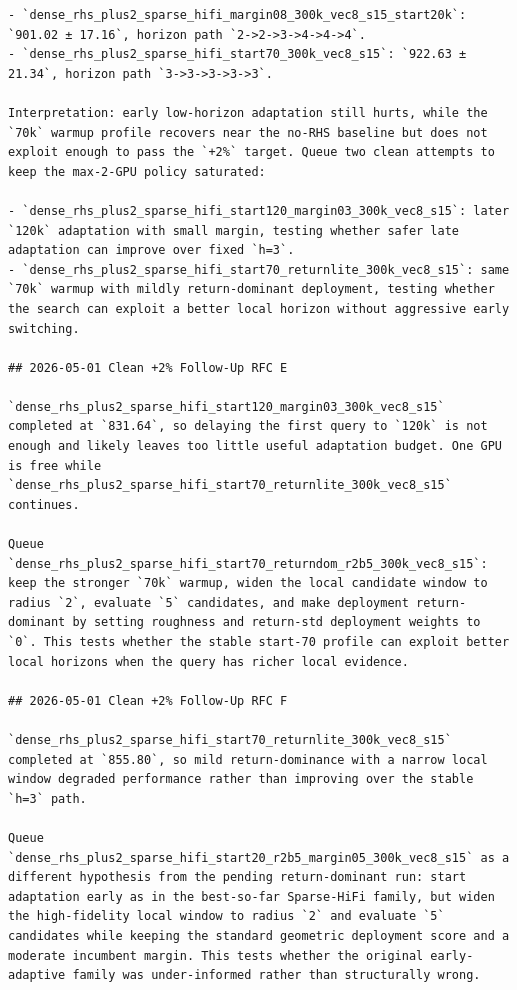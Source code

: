 \begin{verbatim}
- `dense_rhs_plus2_sparse_hifi_margin08_300k_vec8_s15_start20k`: `901.02 ± 17.16`, horizon path `2->2->3->4->4->4`.
- `dense_rhs_plus2_sparse_hifi_start70_300k_vec8_s15`: `922.63 ± 21.34`, horizon path `3->3->3->3->3`.

Interpretation: early low-horizon adaptation still hurts, while the `70k` warmup profile recovers near the no-RHS baseline but does not exploit enough to pass the `+2%` target. Queue two clean attempts to keep the max-2-GPU policy saturated:

- `dense_rhs_plus2_sparse_hifi_start120_margin03_300k_vec8_s15`: later `120k` adaptation with small margin, testing whether safer late adaptation can improve over fixed `h=3`.
- `dense_rhs_plus2_sparse_hifi_start70_returnlite_300k_vec8_s15`: same `70k` warmup with mildly return-dominant deployment, testing whether the search can exploit a better local horizon without aggressive early switching.

## 2026-05-01 Clean +2% Follow-Up RFC E

`dense_rhs_plus2_sparse_hifi_start120_margin03_300k_vec8_s15` completed at `831.64`, so delaying the first query to `120k` is not enough and likely leaves too little useful adaptation budget. One GPU is free while `dense_rhs_plus2_sparse_hifi_start70_returnlite_300k_vec8_s15` continues.

Queue `dense_rhs_plus2_sparse_hifi_start70_returndom_r2b5_300k_vec8_s15`: keep the stronger `70k` warmup, widen the local candidate window to radius `2`, evaluate `5` candidates, and make deployment return-dominant by setting roughness and return-std deployment weights to `0`. This tests whether the stable start-70 profile can exploit better local horizons when the query has richer local evidence.

## 2026-05-01 Clean +2% Follow-Up RFC F

`dense_rhs_plus2_sparse_hifi_start70_returnlite_300k_vec8_s15` completed at `855.80`, so mild return-dominance with a narrow local window degraded performance rather than improving over the stable `h=3` path.

Queue `dense_rhs_plus2_sparse_hifi_start20_r2b5_margin05_300k_vec8_s15` as a different hypothesis from the pending return-dominant run: start adaptation early as in the best-so-far Sparse-HiFi family, but widen the high-fidelity local window to radius `2` and evaluate `5` candidates while keeping the standard geometric deployment score and a moderate incumbent margin. This tests whether the original early-adaptive family was under-informed rather than structurally wrong.


\end{verbatim}
